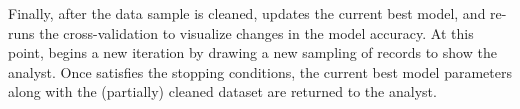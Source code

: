 Finally, after the data sample is cleaned, \sys updates the current best model, and re-runs the cross-validation to visualize changes in the model accuracy.
At this point, \sys begins a new iteration by drawing a new sampling of records to show the analyst.  
Once \sys satisfies the stopping conditions, the current best model parameters along with the (partially) cleaned dataset are returned to the analyst.


